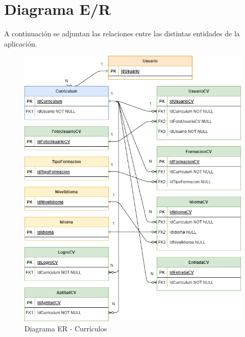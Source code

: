 \section{Diagrama E/R}
A continuación se adjuntan las relaciones entre las distintas entidades de la aplicación.
\begin{figure}[H]
    \centering
    \includegraphics[width=\linewidth]{img/diagramaER_TFG.png}
    \caption{Diagrama ER - Currículos}  
\end{figure}

